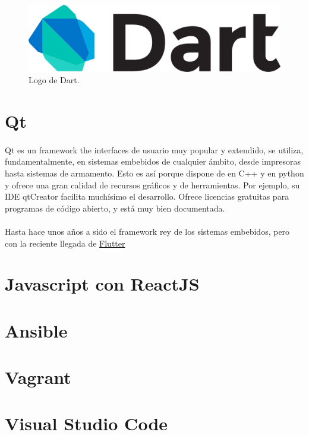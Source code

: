 \begin{figure}[H]
	\centering
	\includegraphics[width=0.50\linewidth]{imgs/dart-logo}
	\caption[Dart Logo]{Logo de Dart.}
	\label{fig:dart}
\end{figure}

\section{Qt}\label{sec:Qt}

\paragraph{}Qt es un \gls{framework} the interfaces de usuario muy popular y extendido,
se utiliza, fundamentalmente, en sistemas embebidos de cualquier ámbito, desde impresoras
hasta sistemas de armamento. Esto es así porque dispone de  en C++ y en
python y ofrece una gran calidad de recursos gráficos y de herramientas. Por ejemplo,
su \gls{IDE} qtCreator facilita muchísimo el desarrollo. Ofrece licencias gratuitas para
programas de código abierto, y está muy bien documentada.

\paragraph{}Hasta hace unos años a sido el framework rey de los sistemas embebidos, pero
con la reciente llegada de \hyperref[sec:flutter]{Flutter}

\section{Javascript con ReactJS}\label{sec:reactjs}

\section{Ansible}\label{sec:ansible}

\section{Vagrant}\label{sec:vagrant}

\section{Visual Studio Code}\label{sec:vscode}


